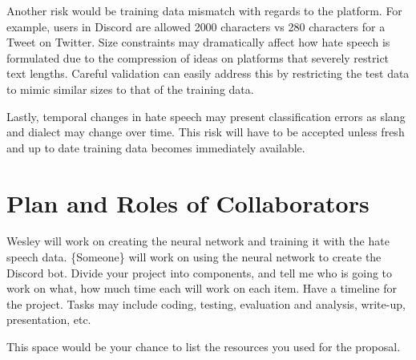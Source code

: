 \documentclass[conference]{sig-alternate-05-2015}
\begin{document}
Another risk would be training data mismatch with regards to the platform.  For example, users in Discord are allowed 2000 characters vs 280 characters for a Tweet on Twitter.  Size constraints may dramatically affect how hate speech is formulated due to the compression of ideas on platforms that severely restrict text lengths.  Careful validation can easily address this by restricting the test data to mimic similar sizes to that of the training data.

Lastly, temporal changes in hate speech may present classification errors as slang and dialect may change over time.  This risk will have to be accepted unless fresh and up to date training data becomes immediately available.
\color{black}

\section{Plan and Roles of Collaborators}

Wesley will work on creating the neural network and training it with the hate speech data.
\{Someone\} will work on using the neural network to create the Discord bot.
\color{red}Divide your project into components, and tell me who is going to work on what, how much time each will work on each item. Have a timeline for the project. Tasks may include coding, testing, evaluation and analysis, write-up, presentation, etc.
\color{black}



\color{red}This space would be your chance to list the resources you used for the proposal.
\end{document}
